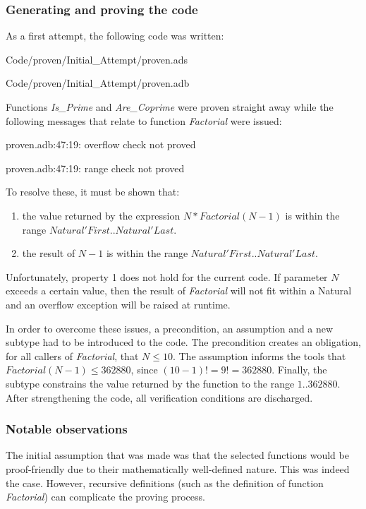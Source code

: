 \documentclass{llncs}
\begin{document}
\subsubsection{Generating and proving the code}
As a first attempt, the following code was written:

{Code/proven/Initial_Attempt/proven.ads}

{Code/proven/Initial_Attempt/proven.adb}

Functions \emph{Is\_Prime} and \emph{Are\_Coprime} were proven
straight away while the following messages that relate to function
\emph{Factorial} were issued:

proven.adb:47:19: overflow check not proved

proven.adb:47:19: range check not proved

\noindent
To resolve these, it must be shown that:
\begin{enumerate}
\item the value returned by the expression $N * Factorial (N - 1)$ is
  within the range $Natural'First .. Natural'Last$.

\item the result of $N - 1$ is within the range $Natural'First
  .. Natural'Last$.
\end{enumerate}
Unfortunately, property 1 does not hold for the current code. If
parameter $N$ exceeds a certain value, then the result of
\emph{Factorial} will not fit within a Natural and an overflow
exception will be raised at runtime.

In order to overcome these issues, a precondition, an assumption and a
new subtype had to be introduced to the code. The precondition creates
an obligation, for all callers of \emph{Factorial}, that $N \leq
10$. The assumption informs the tools that $Factorial (N - 1) \leq
362880$, since $(10 - 1)! = 9! = 362880$. Finally, the subtype
constrains the value returned by the function to the range $1
.. 362880$. After strengthening the code, all verification conditions
are discharged.




\subsubsection{Notable observations}
The initial assumption that was made was that the selected functions
would be proof-friendly due to their mathematically well-defined
nature. This was indeed the case. However, recursive definitions (such
as the definition of function \emph{Factorial}) can 
complicate the proving process.
\end{document}
